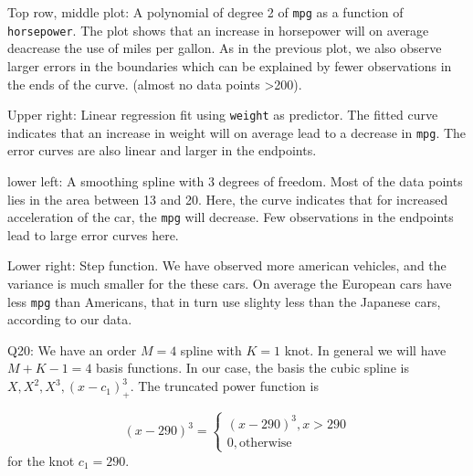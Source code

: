 \documentclass[]{article}
\begin{document}
Top row, middle plot: A polynomial of degree 2 of \texttt{mpg} as a
function of \texttt{horsepower}. The plot shows that an increase in
horsepower will on average deacrease the use of miles per gallon. As in
the previous plot, we also observe larger errors in the boundaries which
can be explained by fewer observations in the ends of the curve. (almost
no data points \textgreater{}200).

Upper right: Linear regression fit using \texttt{weight} as predictor.
The fitted curve indicates that an increase in weight will on average
lead to a decrease in \texttt{mpg}. The error curves are also linear and
larger in the endpoints.

lower left: A smoothing spline with 3 degrees of freedom. Most of the
data points lies in the area between 13 and 20. Here, the curve
indicates that for increased acceleration of the car, the \texttt{mpg}
will decrease. Few observations in the endpoints lead to large error
curves here.

Lower right: Step function. We have observed more american vehicles, and
the variance is much smaller for the these cars. On average the European
cars have less \texttt{mpg} than Americans, that in turn use slighty
less than the Japanese cars, according to our data.

Q20: We have an order \(M=4\) spline with \(K=1\) knot. In general we
will have \(M+K-1=4\) basis functions. In our case, the basis the cubic
spline is \(X,X^2,X^3,(x-c_1)_+^3\). The truncated power function is

\[
(x-290)^3= \begin{cases}(x-290)^3, x>290 \\
0, \text{otherwise}
\end{cases}
\] for the knot \(c_1=290\).
\end{document}
